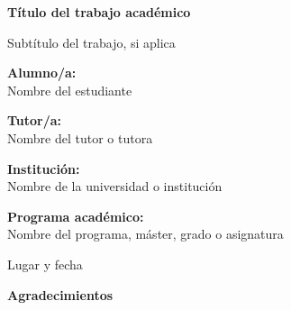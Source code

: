 \documentclass[12pt]{article}
\begin{document}

\begin{titlepage}
    \begin{center}
        \vspace*{1cm}

        \Huge
        \textbf{Título del trabajo académico}\\

        \vspace{0.5cm}

        \LARGE
        Subtítulo del trabajo, si aplica

        \vspace{3cm}

        \textbf{Alumno/a:}\\
        Nombre del estudiante\\

        \vspace{0.5cm}

        \textbf{Tutor/a:}\\
        Nombre del tutor o tutora\\

        \vspace{1cm}

        \textbf{Institución:}\\
        Nombre de la universidad o institución\\

        \vspace{0.5cm}

        \textbf{Programa académico:}\\
        Nombre del programa, máster, grado o asignatura\\

        \vfill

        \Large
        Lugar y fecha

    \end{center}
\end{titlepage}



\begin{center}
\LARGE
\textbf{Agradecimientos}
\end{center}
\end{document}
